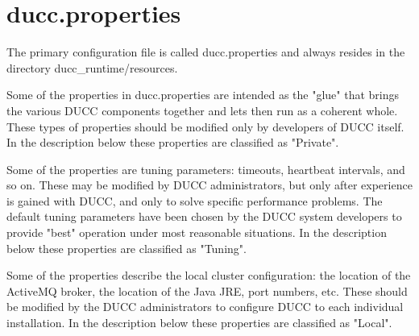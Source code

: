 % 
% 
% 
% 
\section{ducc.properties}
\label{sec:ducc.properties}
    The primary configuration file is called ducc.properties and always resides in the directory
    ducc\_runtime/resources.

    Some of the properties in ducc.properties are intended as the "glue" that brings the various 
    DUCC components together and lets then run as a coherent whole. These types of properties should 
    be modified only by developers of DUCC itself. In the description below these properties are 
    classified as "Private". 

    Some of the properties are tuning parameters: timeouts, heartbeat intervals, and so on. These
    may be modified by DUCC administrators, but only after experience is gained with DUCC, and only
    to solve specific performance problems. The default tuning parameters have been chosen by the
    DUCC system developers to provide "best" operation under most reasonable situations. In the
    description below these properties are classified as "Tuning".

    Some of the properties describe the local cluster configuration: the location of the ActiveMQ
    broker, the location of the Java JRE, port numbers, etc. These should be modified by the DUCC
    administrators to configure DUCC to each individual installation. In the description below these
    properties are classified as "Local".
    

